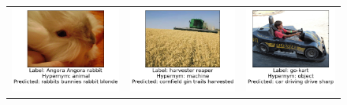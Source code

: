 \begin{figure}
\centering
\tabcolsep=0.08cm
\begin{tabular}{ccc}
\includegraphics[scale=0.23]{chapters/TAL/imagenet/bunny} & \includegraphics[scale=0.23]{chapters/TAL/imagenet/corn} & \includegraphics[scale=0.23]{chapters/TAL/imagenet/gocart} \\

\end{tabular}
\end{figure}
